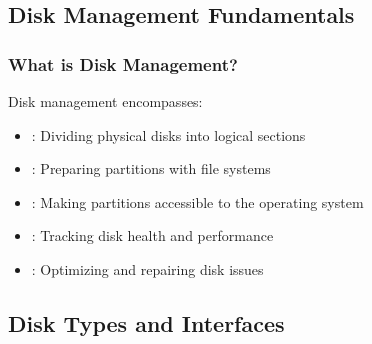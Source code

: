 \documentclass[letterpaper,10pt,english]{sphinxmanual}
\begin{document}
\subsection{Disk Management Fundamentals}
\label{\detokenize{disk-management:disk-management-fundamentals}}

\subsubsection{What is Disk Management?}
\label{\detokenize{disk-management:what-is-disk-management}}
\sphinxAtStartPar
Disk management encompasses:
\begin{itemize}
\item {} 
\sphinxAtStartPar
{}: Dividing physical disks into logical sections

\item {} 
\sphinxAtStartPar
{}: Preparing partitions with file systems

\item {} 
\sphinxAtStartPar
{}: Making partitions accessible to the operating system

\item {} 
\sphinxAtStartPar
{}: Tracking disk health and performance

\item {} 
\sphinxAtStartPar
{}: Optimizing and repairing disk issues

\end{itemize}


\subsection{Disk Types and Interfaces}
\label{\detokenize{disk-management:disk-types-and-interfaces}}
\end{document}

